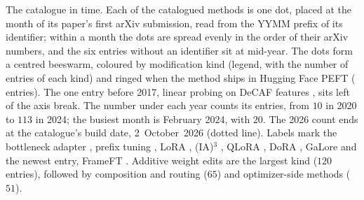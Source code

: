 The catalogue in time. Each of the \nMethods{} catalogued methods is one dot, placed at the month of its paper's first arXiv submission, read from the YYMM prefix of its identifier; within a month the dots are spread evenly in the order of their arXiv numbers, and the six entries without an identifier sit at mid-year. The dots form a centred beeswarm, coloured by modification kind (legend, with the number of entries of each kind) and ringed when the method ships in Hugging Face PEFT (\nHF{} entries). The one entry before 2017, linear probing on DeCAF features \citep{donahue2013decaf}, sits left of the axis break. The number under each year counts its entries, from $10$ in 2020 to $113$ in 2024; the busiest month is February 2024, with $20$. The 2026 count ends at the catalogue's build date, 2~October~2026 (dotted line). Labels mark the bottleneck adapter \citep{houlsby2019parameter}, prefix tuning \citep{li2021prefix}, LoRA \citep{hu2021lora}, (IA)$^3$ \citep{liu2022few}, QLoRA \citep{dettmers2023qlora}, DoRA \citep{liu2024dora}, GaLore \citep{zhao2024galore} and the newest entry, FrameFT \citep{adepu2026fine}. Additive weight edits are the largest kind ($120$ entries), followed by composition and routing ($65$) and optimizer-side methods ($51$).
